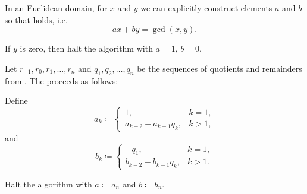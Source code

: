 \begin{algorithm}\label{alg:extended_euclidean_algorithm}
  In an \hyperref[def:euclidean_domain]{Euclidean domain}, for \( x \) and \( y \) we can explicitly construct elements \( a \) and \( b \) so that  holds, i.e.
  \begin{equation*}
    ax + by = \gcd(x, y).
  \end{equation*}

  \begin{thmenum}
     If \( y \) is zero, then halt the algorithm with \( a = 1 \), \( b = 0 \).

     Let \( r_{-1}, r_0, r_1, \ldots, r_n \) and \( q_1, q_2, \ldots, q_n \) be the sequences of quotients and remainders from . The  proceeds as follows:

    Define
    \begin{equation*}
      a_k \coloneqq \begin{cases}
        1,                     &k = 1, \\
        a_{k-2} - a_{k-1} q_k, &k > 1,
      \end{cases}
    \end{equation*}
    and
    \begin{equation*}
      b_k \coloneqq \begin{cases}
        -q_1,                  &k = 1, \\
        b_{k-2} - b_{k-1} q_k, &k > 1.
      \end{cases}
    \end{equation*}

    Halt the algorithm with \( a \coloneqq a_n \) and \( b \coloneqq b_n \).
  \end{thmenum}
\end{algorithm}
